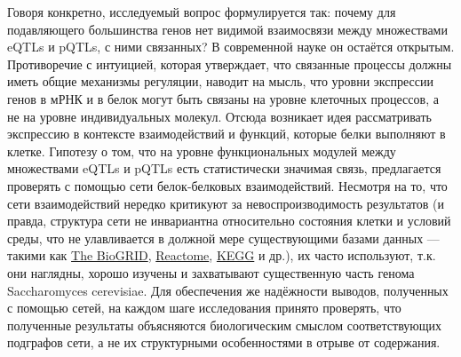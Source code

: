 \documentclass[11pt,a4paper]{report}
\theoremstyle{definition}
\theoremstyle{definition}
\theoremstyle{definition}
\begin{document}
	Говоря конкретно, исследуемый вопрос формулируется так: почему для подавляющего большинства генов нет видимой взаимосвязи между множествами eQTLs и pQTLs, с ними связанных? В современной науке он остаётся открытым. Противоречие с интуицией, которая утверждает, что связанные процессы должны иметь общие механизмы регуляции, наводит на мысль, что уровни экспрессии генов в мРНК и в белок могут быть связаны на уровне клеточных процессов, а не на уровне индивидуальных молекул. Отсюда возникает идея рассматривать экспрессию в контексте взаимодействий и функций, которые белки выполняют в клетке. Гипотезу о том, что на уровне функциональных модулей между множествами eQTLs и pQTLs есть статистически значимая связь, предлагается проверять с помощью сети белок-белковых взаимодействий. Несмотря на то, что сети взаимодействий нередко критикуют за невоспроизводимость результатов (и правда, структура сети не инвариантна относительно состояния клетки и условий среды, что не улавливается в должной мере существующими базами данных — такими как \href{https://thebiogrid.org/}{The BioGRID}, \href{https://reactome.org/}{Reactome}, \href{http://www.genome.jp/kegg/}{KEGG} и др.), их часто используют, т.к. они наглядны, хорошо изучены и захватывают существенную часть генома Saccharomyces cerevisiae. Для обеспечения же надёжности выводов, полученных с помощью сетей, на каждом шаге исследования принято проверять, что полученные результаты объясняются биологическим смыслом соответствующих подграфов сети, а не их структурными особенностями в отрыве от содержания.
	
\end{document}
